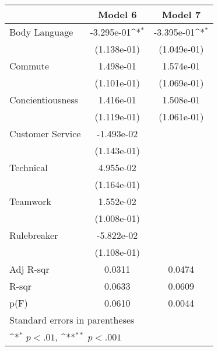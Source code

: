 
{
\def\sym#1{\ifmmode^{#1}\else\(^{#1}\)\fi}
\begin{tabular}{l*{2}{c}}
    \toprule
                     & \multicolumn{1}{c}{Model 6} & \multicolumn{1}{c}{Model 7} \\
    \midrule
    Body Language    & -3.295e-01\sym{*}           & -3.395e-01\sym{*}           \\
                     & (1.138e-01)                 & (1.049e-01)                 \\
    \addlinespace
    Commute          & 1.498e-01                   & 1.574e-01                   \\
                     & (1.101e-01)                 & (1.069e-01)                 \\
    \addlinespace
    Concientiousness & 1.416e-01                   & 1.508e-01                   \\
                     & (1.119e-01)                 & (1.061e-01)                 \\
    \addlinespace
    Customer Service & -1.493e-02                  &                             \\
                     & (1.143e-01)                 &                             \\
    \addlinespace
    Technical        & 4.955e-02                   &                             \\
                     & (1.164e-01)                 &                             \\
    \addlinespace
    Teamwork         & 1.552e-02                   &                             \\
                     & (1.008e-01)                 &                             \\
    \addlinespace
    Rulebreaker      & -5.822e-02                  &                             \\
                     & (1.108e-01)                 &                             \\
    \midrule
    Adj R-sqr        & 0.0311                      & 0.0474                      \\
    R-sqr            & 0.0633                      & 0.0609                      \\
    p(F)             & 0.0610                      & 0.0044                      \\
    \bottomrule
    \multicolumn{3}{l}{\footnotesize Standard errors in parentheses}             \\
    \multicolumn{3}{l}{\footnotesize \sym{*} \(p<.01\), \sym{**} \(p<.001\)}     \\
\end{tabular}
}